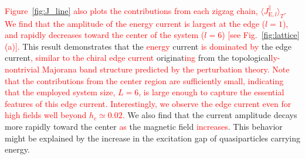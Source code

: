\documentclass[twocolumn,superscriptaddress,showpacs, longbibliography, aps, prb]{revtex4-2}
\newcommand{\red}[1]{\textcolor{red}{#1}}
\newcommand{\blue}[1]{\textcolor{blue}{#1}}
\begin{document}
\red{Figure~\ref{fig:J_line} also plots the contributions from each zigzag chain, $\langle J_{\mathrm{E},l}^\parallel \rangle_T$. 
We find that the amplitude of the energy current i\red{s %
l}argest at the edge ($l=1$), and rapidly decreases toward the center of the system ($l=6$) [see Fig.~\ref{fig:lattice}(a)].} 
This result demonstrates that the %
\red{energy} current %
\red{is dominated by} 
the edge current\red{,  %
similar to the chiral edge current} 
originat\red{ing} %
from
the topological\red{ly-nontrivial Majorana band structure predicted by the perturbation theory.} %
\red{Note that the contributions from the center region are sufficiently small, indicating that the employed system size, $L=6$, is large enough to capture the essential features of this edge current. 
Interestingly, we observe the edge current even for high fields well beyond $h_c \simeq 0.02$.} 
We also %
find that %
the current amplitude decays more rapidly toward the center %
\red{as} the magnetic field \red{increases}. 
This behavior might be explained by the increase in the excitation gap of quasiparticles carrying energy. %
\end{document}
